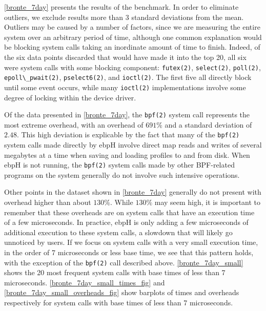 \documentclass[
  12pt]{findlay}
\begin{document}
\autoref{bronte_7day} presents the results of the benchmark. In order to
eliminate outliers, we exclude results more than 3 standard deviations
from the mean. Outliers may be caused by a number of factors, since we
are measuring the entire system over an arbitrary period of time,
although one common explanation would be blocking system calls taking an
inordinate amount of time to finish. Indeed, of the six data points
discarded that would have made it into the top 20, all six were system
calls with some blocking component: \passthrough{\lstinline!futex(2)!},
\passthrough{\lstinline!select(2)!}, \passthrough{\lstinline!poll(2)!},
\passthrough{\lstinline!epoll\_pwait(2)!},
\passthrough{\lstinline!pselect6(2)!}, and
\passthrough{\lstinline!ioctl(2)!}. The first five all directly block
until some event occurs, while many \passthrough{\lstinline!ioctl(2)!}
implementations involve some degree of locking within the device driver.

Of the data presented in \autoref{bronte_7day}, the
\passthrough{\lstinline!bpf(2)!} system call represents the most extreme
overhead, with an overhead of \(691\%\) and a standard deviation of
\(2.48\). This high deviation is explicable by the fact that many of the
\passthrough{\lstinline!bpf(2)!} system calls made directly by ebpH
involve direct map reads and writes of several megabytes at a time when
saving and loading profiles to and from disk. When ebpH is not running,
the \passthrough{\lstinline!bpf(2)!} system calls made by other
BPF-related programs on the system generally do not involve such
intensive operations.

Other points in the dataset shown in \autoref{bronte_7day} generally do
not present with overhead higher than about \(130\%\). While \(130\%\)
may seem high, it is important to remember that these overheads are on
system calls that have an execution time of a few microseconds. In
practice, ebpH is only adding a few microseconds of additional execution
to these system calls, a slowdown that will likely go unnoticed by
users. If we focus on system calls with a very small execution time, in
the order of 7 microseconds or less base time, we see that this pattern
holds, with the exception of the \passthrough{\lstinline!bpf(2)!} call
described above. \autoref{bronte_7day_small} shows the 20 most frequent
system calls with base times of less than 7 microseconds.
\autoref{bronte_7day_small_times_fig} and
\autoref{bronte_7day_small_overheads_fig} show barplots of times and
overheads respectively for system calls with base times of less than 7
microseconds.
\end{document}
